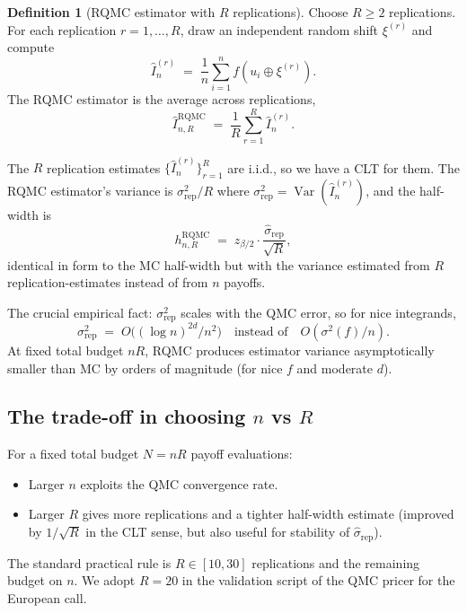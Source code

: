 \documentclass[11pt,a4paper]{article}
\theoremstyle{plain}
\theoremstyle{definition}
\newtheorem{definition}[theorem]{Definition}
\theoremstyle{remark}
\newcommand{\Var}{\operatorname{Var}}
\begin{document}
\begin{definition}[RQMC estimator with $R$ replications]
\label{def:rqmc}
Choose $R \geq 2$ replications. For each replication $r = 1, \ldots,
R$, draw an independent random shift $\xi^{(r)}$ and compute
\begin{equation}
\hat I_n^{(r)} \;=\; \frac{1}{n} \sum_{i=1}^n f(u_i \oplus \xi^{(r)}).
\end{equation}
The RQMC estimator is the average across replications,
\begin{equation}
\hat I_{n, R}^{\mathrm{RQMC}} \;=\; \frac{1}{R} \sum_{r=1}^R \hat I_n^{(r)}.
\end{equation}
\end{definition}

The $R$ replication estimates $\{\hat I_n^{(r)}\}_{r=1}^R$ are
i.i.d., so we have a CLT for them. The RQMC estimator's variance is
$\sigma_{\mathrm{rep}}^2 / R$ where $\sigma_{\mathrm{rep}}^2 =
\Var(\hat I_n^{(r)})$, and the half-width is
\begin{equation}
h_{n, R}^{\mathrm{RQMC}} \;=\; z_{\beta/2} \cdot
\frac{\hat\sigma_{\mathrm{rep}}}{\sqrt R},
\end{equation}
identical in form to the MC half-width but with the variance estimated
from $R$ replication-estimates instead of from $n$ payoffs.

The crucial empirical fact: $\sigma_{\mathrm{rep}}^2$ scales with
the QMC error, so for nice integrands,
\begin{equation}
\sigma_{\mathrm{rep}}^2 \;=\; O\bigl((\log n)^{2d} / n^2\bigr)
\quad\text{instead of}\quad O(\sigma^2(f) / n).
\end{equation}
At fixed total budget $nR$, RQMC produces estimator variance
asymptotically smaller than MC by orders of magnitude (for nice $f$
and moderate $d$).

\subsection{The trade-off in choosing $n$ vs $R$}

For a fixed total budget $N = nR$ payoff evaluations:
\begin{itemize}
\item Larger $n$ exploits the QMC convergence rate.
\item Larger $R$ gives more replications and a tighter half-width
estimate (improved by $1/\sqrt R$ in the CLT sense, but also useful
for stability of $\hat\sigma_{\mathrm{rep}}$).
\end{itemize}
The standard practical rule is $R \in [10, 30]$ replications and the
remaining budget on $n$. We adopt $R = 20$ in the validation script
of the QMC pricer for the European call.
\end{document}
